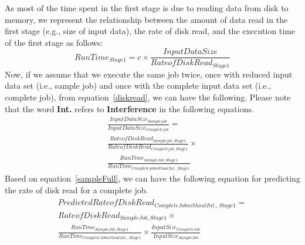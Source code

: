\noindent 
As most of the time spent in the first stage is due to reading data from disk to memory, we represent the relationship between the amount of data read in the first stage (e.g., size of input data), the rate of disk read, and the execution time of the first stage as follows: 
\begin{equation}
\label{diskread}
RunTime_{Stage 1}=c \times \frac{Input Data Size}{Rate of DiskRead_{Stage 1}} \end{equation}
\noindent 
Now, if we assume that we execute the same job twice, once with reduced input data set (i.e., sample job) and once with the complete input data set (i.e., complete job), from equation~\ref{diskread}, we can have the following. Please note that the word {\textbf{Int.}} refers to {\textbf{Interference}} in the following equations. 
\begin{equation}
\label{sampleFull}
\begin{gathered}
\frac{InputDataSize_{Sample job}}{InputDataSize_{Complete job}} = \\
\frac{Rate of Disk Read_{Sample job, Stage 1}}{RateofDiskRead_{Complete job, Stage 1}} \times \\
\frac{RunTime_{Sample Job, Stage 1}}{RunTime_{Complete job without Int., Stage 1}}
\end{gathered}
\end{equation}
Based on equation~\ref{sampleFull}, we can have the following equation for predicting the rate of disk read for a complete job. 
\begin{eqnarray}
\label{fullDiskIORead}
\begin{gathered}
Predicted Rate of Disk Read_{Complete Job without Int., Stage1} \nonumber = \\
Rate of Disk Read_{Sample Job, Stage 1} \times \\
\frac{RunTime_{Sample Job, Stage 1}}{RunTime_{Complete Job without Int., Stage 1}} \times \frac{Input Size_{Complete Job}}{Input Size_{Sample Job}}
\end{gathered}
\end{eqnarray}
